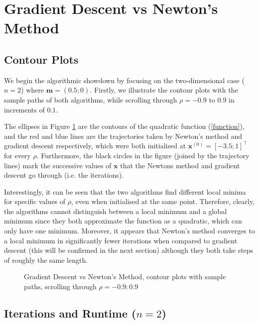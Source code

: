 \documentclass[12pt, authoryear]{elsarticle}
\begin{document}
\section{Gradient Descent vs Newton's Method}  \label{sec1}

\subsection{Contour Plots}
We begin the algorithmic showdown by focusing on the two-dimensional case ($n = 2$) where $\boldsymbol{m} = (0.5; 0)$. Firstly, we illustrate the contour plots with the sample paths of both algorithms, while scrolling through $\rho = -0.9$ to $0.9$ in increments of $0.1$.  

The ellipses in Figure \ref{fig:rho} are the contours of the quadratic function (\ref{function}), and the red and blue lines are the trajectories taken by Newton's method and gradient descent respectively, which were both initialised at $\boldsymbol{x} ^ { ( 0) } = [-3.5; 1]^\top $ for every $\rho$. Furthermore, the black circles in the figure (joined by the trajectory lines) mark the successive values of $\boldsymbol{x}$ that the Newtons method and gradient descent go through (i.e. the iterations).

Interestingly, it can be seen that the two algorithms find different local minima for specific values of $\rho$, even when initialised at the same point. Therefore, clearly, the algorithms cannot distinguish between a local minimum and a global minimum since they both approximate the function as a quadratic, which can only have one minimum. Moreover, it appears that Newton's method converges to a local minimum in significantly fewer iterations when compared to gradient descent (this will be confirmed in the next section) although they both take steps of roughly the same length.

\begin{figure}[H]
	\begin{center}
		\caption{Gradient Descent vs Newton's Method, contour plots with sample paths, scrolling through $\rho = -0.9 : 0.9$}
		\label{fig:rho}
	\end{center}
	\vspace{5mm}
\end{figure}

\subsection{Iterations and Runtime ($n=2$)}
\end{document}
